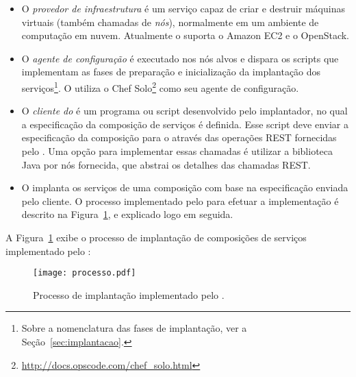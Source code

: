 \begin{itemize}

\item O \emph{provedor de infraestrutura} é um serviço capaz de criar e destruir máquinas virtuais 
(também chamadas de \emph{nós}), normalmente em um ambiente de computação em nuvem. 
Atualmente o \ee suporta o Amazon EC2 e o OpenStack.

\item O \emph{agente de configuração} é executado nos nós alvos
e dispara os scripts que implementam as fases de preparação
e inicialização da implantação dos serviços\footnote{Sobre a nomenclatura das fases de implantação, ver a Seção~\ref{sec:implantacao}.}.
O \ee utiliza o Chef Solo\footnote{\url{http://docs.opscode.com/chef_solo.html}}
como seu agente de configuração.

\item O \emph{cliente do \ee} é um programa ou script desenvolvido
pelo implantador, no qual a especificação da composição de serviços é definida.
Esse script deve enviar a especificação da composição para o \ee
através das operações REST fornecidas pelo \ee.
Uma opção para implementar essas chamadas é utilizar
a biblioteca Java por nós fornecida, que abstrai os detalhes
das chamadas REST.

\item O \emph{\ee} implanta os serviços de uma composição
com base na especificação enviada pelo cliente.
O processo implementado pelo \ee para efetuar a implementação
é descrito na Figura~\ref{fig:processo}, e explicado logo em seguida. 


\end{itemize} 

A Figura~\ref{fig:processo} exibe o processo de implantação de composições
de serviços implementado pelo \ee:

\begin{figure}[ht]
\centering
\texttt{[image: processo.pdf]}
\caption{Processo de implantação implementado pelo \ee.}
\label{fig:processo}
\end{figure}

